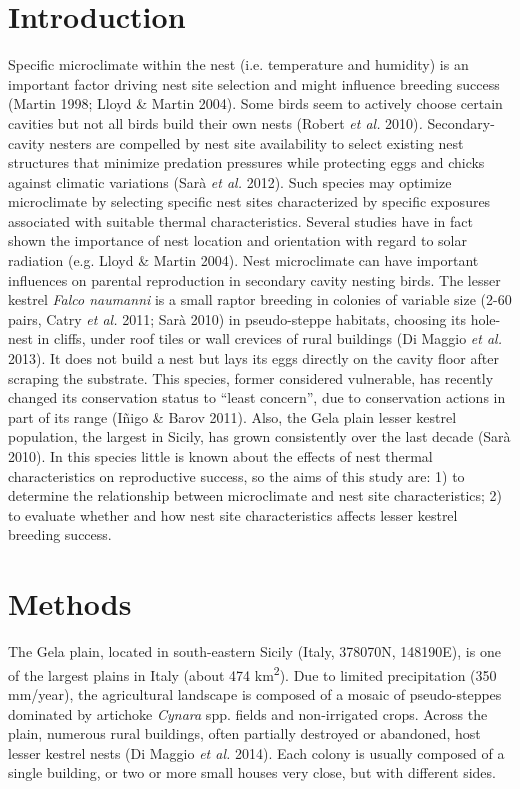  
\section*{Introduction}

Specific microclimate within the nest (i.e. temperature and humidity) is
an important factor driving nest site selection and might influence
breeding success (Martin 1998; Lloyd \& Martin 2004). Some birds seem
to actively choose certain cavities but not all birds build their own
nests (Robert \textit{et al. }2010)\textit{.} Secondary-cavity nesters
are compelled by nest site availability to select existing nest
structures that minimize predation pressures while protecting eggs and
chicks against climatic variations (Sar\`a \textit{et al.} 2012). Such
species may optimize microclimate by selecting specific nest sites
characterized by specific exposures associated with suitable thermal
characteristics. Several studies have in fact shown the importance of
nest location and orientation with regard to solar radiation (e.g.
Lloyd \& Martin 2004). Nest microclimate can have important influences
on parental reproduction in secondary cavity nesting birds. The lesser
kestrel \textit{Falco naumanni} is a small raptor breeding in colonies
of variable size (2-60 pairs, Catry \textit{et al.} 2011; Sar\`a 2010)
in pseudo-steppe habitats, choosing its hole-nest in cliffs, under roof
tiles or wall crevices of rural buildings (Di Maggio \textit{et al.}
2013). It does not build a nest but lays its eggs directly on the
cavity floor after scraping the substrate. This species, former
considered {vulnerable}, has recently changed its
conservation status to {\textquotedblleft}least
concern{\textquotedblright}, due to conservation actions in part of its
range (I\~nigo \& Barov 2011). Also, the Gela plain lesser kestrel
population, the largest in Sicily, has grown consistently over the last
decade (Sar\`a 2010). In this species little is known about the effects
of nest thermal characteristics on reproductive success, so the aims of
this study are: 1) to determine the relationship between microclimate
and nest site characteristics; 2) to evaluate whether and how nest site
characteristics affects lesser kestrel breeding success.

\section*{Methods}

The Gela plain, located in south-eastern Sicily (Italy, 378070N,
148190E), is one of the largest plains in Italy (about 474
km\textsuperscript{2}). Due to limited precipitation (350 mm/year), the
agricultural landscape is composed of a mosaic of pseudo-steppes
dominated by artichoke \textit{Cynara} spp. fields and non-irrigated
crops. Across the plain, numerous rural buildings, often partially
destroyed or abandoned, host lesser kestrel nests (Di Maggio \textit{et
al.} 2014). Each colony is usually composed of a single building, or
two or more small houses very close, but with different sides.

